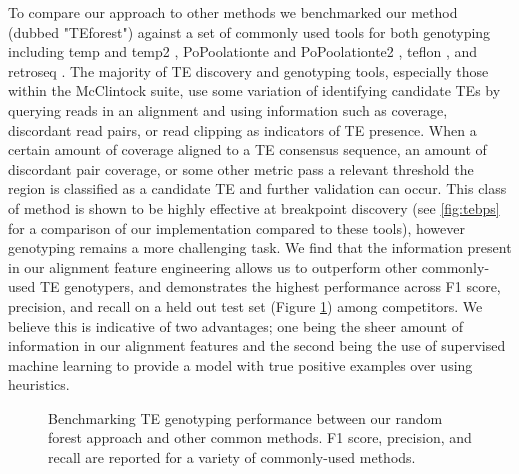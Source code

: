 To compare our approach to other methods we benchmarked our method (dubbed "TEforest") against a set of commonly used tools for both genotyping including temp and temp2 \cite{yuBenchmarkAlgorithmDetecting2021}, PoPoolationte and PoPoolationte2 \cite{koflerPoPoolation2IdentifyingDifferentiation2011}, teflon \cite{adrionGenomeWideEstimatesTransposable2017}, and retroseq \cite{keaneRetroSeqTransposableElement2013}. The majority of TE discovery and genotyping tools, especially those within the McClintock suite, use some variation of identifying candidate TEs by querying reads in an alignment and using information such as coverage, discordant read pairs, or read clipping as indicators of TE presence. When a certain amount of coverage aligned to a TE consensus sequence, an amount of discordant pair coverage, or some other metric pass a relevant threshold the region is classified as a candidate TE and further validation can occur. This class of method is shown to be highly effective at breakpoint discovery (see \ref{fig:tebps} for a comparison of our implementation compared to these tools), however genotyping remains a more challenging task. We find that the information present in our alignment feature engineering allows us to outperform other commonly-used TE genotypers, and demonstrates the highest performance across F1 score, precision, and recall on a held out test set (Figure \ref{fig:teperf}) among competitors. We believe this is indicative of two advantages; one being the sheer amount of information in our alignment features and the second being the use of supervised machine learning to provide a model with true positive examples over using heuristics.

\begin{figure}
    \centering
    \caption[Benchmarking TE genotyping performance between common methods.]{Benchmarking TE genotyping performance between our random forest approach and other common methods. F1 score, precision, and recall are reported for a variety of commonly-used methods.}
    \label{fig:teperf}
\end{figure}

